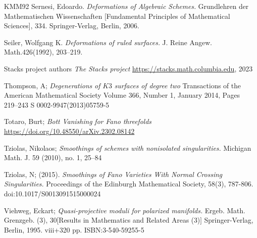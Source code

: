 \documentclass[11pt,twoside]{amsart}
\theoremstyle{plain}
\numberwithin{equation}{section}
\theoremstyle{definition}
\begin{document}
\begin{thebibliography}{KMM92}
Sernesi, Edoardo.
\emph{Deformations of Algebraic Schemes.}
Grundlehren der Mathematischen Wissenschaften [Fundamental Principles of Mathematical Sciences], 334. Springer-Verlag, Berlin, 2006.

Seiler, Wolfgang K.
\emph{Deformations of ruled surfaces.}
J. Reine Angew. Math.426(1992), 203–219.

Stacks project authors
\emph{The Stacks project}
\url{https://stacks.math.columbia.edu}, 2023

Thompson, A;
\emph{Degenerations of $K3$ surfaces of degree two}
Transactions of the American Mathematical Society
Volume 366, Number 1, January 2014, Pages 219–243
S 0002-9947(2013)05759-5

Totaro, Burt;
\emph{Bott Vanishing for Fano threefolds}
\url{https://doi.org/10.48550/arXiv.2302.08142}


Tziolas, Nikolaos; 
\emph{Smoothings of schemes with nonisolated singularities.}
Michigan Math. J. 59 (2010), no. 1, 25--84


Tziolas, N; (2015). 
\emph{Smoothings of Fano Varieties With Normal Crossing Singularities.} 
Proceedings of the Edinburgh Mathematical Society, 58(3), 787-806. doi:10.1017/S0013091515000024

Viehweg, Eckart;
\emph{Quasi-projective moduli for polarized manifolds.}
Ergeb. Math. Grenzgeb. (3), 30[Results in Mathematics and Related Areas (3)] Springer-Verlag, Berlin, 1995. viii+320 pp.
ISBN:3-540-59255-5



 






  

\end{thebibliography}
\end{document}
